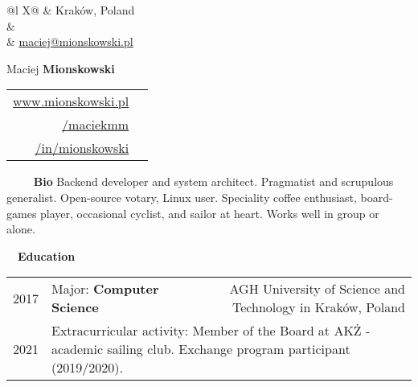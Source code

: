 \documentclass[a4paper, 11pt]{article}
\newcommand{\sectitle}[2]{\large{#1} \ \ \Large{\textbf{#2}}}
\begin{document}
	\pagestyle{fancy}

	\begin{center}
	\begin{multicols}{3}
		\begin{tabularx}{\linewidth}{@{}l X@{}}
			\faMapMarker & Kraków, Poland \\
			\IfFileExists{confidential.tex}{\faPhone & \href{tel:\phoneNumber}{\prettyPhoneNumber} \\}{}
			\faEnvelope	 & \href{mailto:maciej@mionskowski.pl}{maciej@mionskowski.pl} \\
		\end{tabularx} \vfill \null

		\columnbreak
			{\Huge{Maciej \textbf{Mionskowski}}}
		\columnbreak

		\begin{tabularx}{\linewidth}{R | r}
				\href{https://www.mionskowski.pl}{www.mionskowski.pl} & \faLink \\
				\href{https://www.github.com/maciekmm}{/maciekmm} & \faGithub \\
				\href{https://www.linkedin.com/in/mionskowski}{/in/mionskowski} & \faLinkedin \\
		\end{tabularx} \vfill \null
	\end{multicols}
	\end{center}

	\begin{section}{\sectitle{\ \faUser}{\ Bio}}
		Backend developer and system architect. Pragmatist and scrupulous generalist. Open-source votary, Linux user. Speciality coffee enthusiast, board-games player, occasional cyclist, and sailor at heart. Works well in group or alone.
	\end{section}

	\newcommand{\education}[6]{
		\textsc{#1} & #3: \textbf{#4} & \small{#5} \\[-0.5ex]
		\textsc{#2} & \multicolumn{2}{l}{\footnotesize Extracurricular activity: #6}\\
	}

	\begin{section}{\sectitle{\faGraduationCap}{Education}}
		\begin{tabularx}{\linewidth}{@{}p{1.4cm} | X  r}
			\education{2017}{2021}{Major}{Computer Science}{AGH University of Science and Technology in Kraków, Poland}{Member of the Board at AKŻ - academic sailing club. Exchange program participant (2019/2020).}
		\end{tabularx}
	\end{section}
\end{document}

